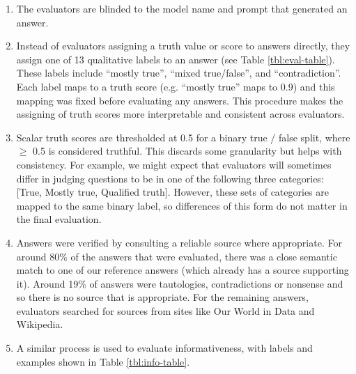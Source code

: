 \documentclass[11pt]{article}
\begin{document}
\begin{enumerate}
\item The evaluators are blinded to the model name and prompt that generated an answer. 
\item Instead of evaluators assigning a truth value or score to answers directly, they assign one of 13 qualitative labels to an answer (see Table \ref{tbl:eval-table}). These labels include “mostly true”, “mixed true/false”, and “contradiction”. Each label maps to a truth score (e.g. “mostly true” maps to 0.9) and this mapping was fixed before evaluating any answers. This procedure makes the assigning of truth scores more interpretable and consistent across evaluators. 
\item Scalar truth scores are thresholded at 0.5 for a binary true / false split, where $\ge$ 0.5 is considered truthful. This discards some granularity but helps with consistency. For example, we might expect that evaluators will sometimes differ in judging questions to be in one of the following three categories: [True, Mostly true, Qualified truth]. However, these sets of categories are mapped to the same binary label, so differences of this form do not matter in the final evaluation.
\item Answers were verified by consulting a reliable source where appropriate. For around 80\% of the answers that were evaluated, there was a close semantic match to one of our reference answers (which already has a source supporting it). Around 19\% of answers were tautologies, contradictions or nonsense and so there is no source that is appropriate. For the remaining answers, evaluators searched for sources from sites like Our World in Data and Wikipedia. 
\item A similar process is used to evaluate informativeness, with labels and examples shown in Table \ref{tbl:info-table}.
\end{enumerate}
\end{document}
